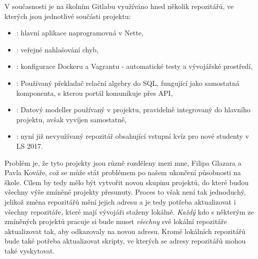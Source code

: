 V současnosti je na školním Gitlabu využíváno hned několik repozitářů, ve kterých jsou jednotlivé součásti projektu:
\begin{itemize}
 	\item {}: hlavní aplikace naprogramovná v Nette,
 	\item {}: veřejné nahlašování chyb,
 	\item {}: konfigurace Dockeru a Vagrantu - automatické testy a vývojářské prostředí,
 	\item {}: Používaný překladač relační algebry do SQL, fungující jako samostatná komponenta, s kterou portál komunikuje přes API,
 	\item {}: Datový modeller používaný v projektu, pravidelně integrovaný do hlavního projektu, avšak vyvíjen samostatně,
 	\item {}: nyní již nevyužívaný repozitář obsahující vstupní kvíz pro nové studenty v LS 2017.
\end{itemize}
Problém je, že tyto projekty jsou různě rozděleny mezi mne, Filipa Glazara a Pavla Kováře, což se může stát problémem po našem ukončení působnosti na škole. Cílem by tedy mělo být vytvořit novou skupinu projektů, do které budou všechny výše zmíněné projekty přesunuty. Proces to však není tak jednoduchý, jelikož změna  repozitářů mění jejich adresu a je tedy potřeba aktualizovat i všechny repozitáře, které mají vývojáři staženy lokálně. \emph{Každý} kdo s některým ze zmíněných projektů pracuje si bude muset \emph{všechny} své lokální repozitáře aktualizovat tak, aby odkazovaly na novou adresu. Kromě lokálních repozitářů bude také potřeba aktualizovat skripty, ve kterých se adresy repozitářů mohou také vyskytovat.

